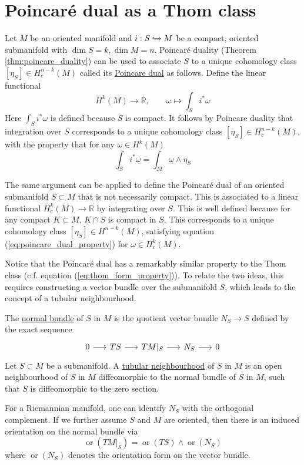 \section{Poincar\'e dual as a Thom class}
Let $M$ be an oriented manifold and $i: S \xhookrightarrow{} M$ be a compact,
oriented submanifold with $\dim S = k, \dim M = n$. 
Poincar\'e duality (Theorem \ref{thm:poincare_duality}) can be used to associate 
$S$ to a unique cohomology class $[\eta_S]\in H^{n-k}_c(M)$ called its
\underline{Poincare dual} as follows. Define the linear functional
\[
H^k(M) \to \mathbb{R}, \qquad 
\omega \mapsto \int_S i^*\omega
\] 
Here $\int_S i^*\omega$ is defined because $S$ is compact. 
It follows by Poincare duality that integration over $S$ corresponds to a
unique cohomology class $[\eta_S]\in H^{n-k}_c(M)$, with the property that 
for any $\omega\in H^k(M)$
\begin{equation} \label{eq:poincare_dual_property}
	\int_S i^*\omega = \int_M \omega \wedge \eta_S
\end{equation}
\begin{remark} %
	The same argument can be applied to define the Poincar\'e dual of an
	oriented submanifold $S \subset M$ that is not
	necessarily compact. This is associated to a linear functional 
	$H^k_c(M) \to \mathbb{R}$ by integrating over $S$. This is well defined
	because for any	compact $K\subset M$, $K\cap S$ is compact in $S$.
	This corresponds to a unique cohomology class $[\eta_S] \in H^{n-k}(M)$,
	satisfying equation (\ref{eq:poincare_dual_property}) for $\omega \in
	H^k_c(M)$.
\end{remark}
Notice that the Poincar\'e dual has a remarkably similar property to the 
Thom class (c.f. equation (\ref{eq:thom_form_property})). 
To relate the two ideas, this requires constructing a vector bundle over the
submanifold $S$, which leads to the concept of a tubular neighbourhood.
\begin{defn}
	The \underline{normal bundle} of $S$ in  $M$ is the quotient vector bundle
	$N_S\to S$ defined by the exact sequence 
	\[
	\begin{tikzcd}[column sep = 1.6em]
		0 \arrow[r] & TS \arrow[r] & TM|_S \arrow[r] 
						& N_S \arrow[r] & 0
	\end{tikzcd}
	\]
	Let $S \subset M$ be a submanifold. 
	A \underline{tubular neighbourhood} of  $S$ in  $M$ is an open
	neighbourhood of  $S$ in  $M$ diffeomorphic to the normal bundle of $S$ in
	 $M$, such that  $S$ is diffeomorphic to the zero section.
\end{defn}
For a Riemannian manifold, one can identify $N_S$ with the orthogonal
complement. If we further assume $S$ and $M$ are oriented, then there is an
induced orientation on the normal bundle via 
\begin{equation} \label{eq:normal_orientation}
	\operatorname{or}(TM|_S) = \operatorname{or}(TS)\wedge \operatorname{or}(N_S)
\end{equation}
where $\operatorname{or}(N_S)$ denotes the orientation form on the vector bundle. 

